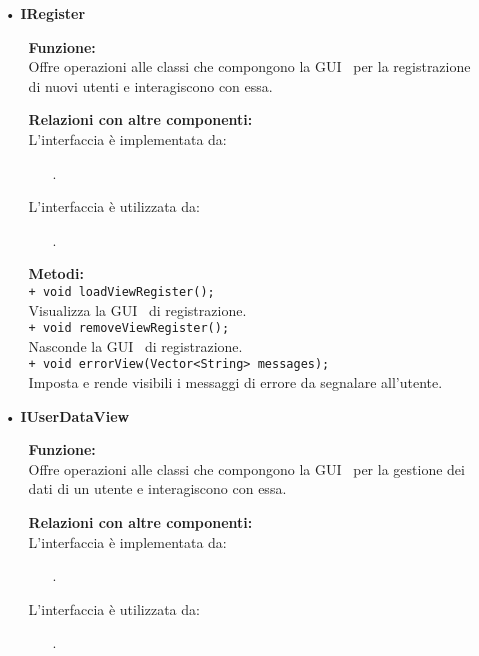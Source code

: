 {\begin{sloppypar}
{\begin{itemize}
		\item[•] \textbf{IRegister}
		\begin{itemize}
			\item[] \textbf{Funzione:}\\
				Offre operazioni alle classi che compongono la GUI\g~ per la registrazione di nuovi utenti e interagiscono con essa.\\
				
			\item[] \textbf{Relazioni con altre componenti:}\\
				L'interfaccia è implementata da:
				\begin{itemize}
					\item[] . 
				\end{itemize}
				L'interfaccia è utilizzata da:
				\begin{itemize}
					\item[] . 
				\end{itemize}
				
			\item[] \textbf{Metodi:}\\
				\texttt{+ void loadViewRegister();}\\
				Visualizza la GUI\g~ di registrazione.\\
				
				\texttt{+ void removeViewRegister();}\\
				Nasconde la GUI\g~ di registrazione.\\
				
				\texttt{+ void errorView(Vector<String> messages);}\\
				Imposta e rende visibili i messaggi di errore da segnalare all’utente.\\
		\end{itemize}
		
		\item[•] \textbf{IUserDataView}
		\begin{itemize}
			\item[] \textbf{Funzione:}\\
				  Offre operazioni alle classi che compongono la GUI\g~ per la gestione dei dati di un utente e interagiscono con essa.\\
				
			\item[] \textbf{Relazioni con altre componenti:}\\
				L'interfaccia è implementata da:
				\begin{itemize}
					\item[] . 
				\end{itemize}
				L'interfaccia è utilizzata da:
				\begin{itemize}
					\item[] . 
				\end{itemize}
				

\end{itemize}
\end{itemize}}
\end{sloppypar}}
